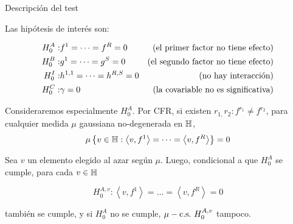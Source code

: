 \documentclass[10pt,spanish]{beamer}\usepackage[]{graphicx}\usepackage[]{color}
\begin{document}
%
\begin{frame}{Descripción del test}

Las hipótesis de interés son:

\vspace{-15pt}

\begin{alignat*}{2}
H_{0}^{A}: & f^{1}=\dots=f^{R}=0 & \textnormal{(el primer factor no tiene efecto)}\\
H_{0}^{B}: & g^{1}=\dots=g^{S}=0 & \textnormal{(el segundo factor no tiene efecto)}\\
H_{0}^{I}: & h^{1,1}=\dots=h^{R,S}=0 & \textnormal{(no hay interacción)}\\
H_{0}^{C}: & \gamma=0 & \textnormal{(la covariable no es significativa)}
\end{alignat*}


\pause{}

Consideraremos especialmente $H_{0}^{A}.$ Por CFR, si existen $r_{1,}r_{2}:f^{r_{1}}\neq f^{r_{2}}$,
para cualquier medida $\mu$ gaussiana no-degenerada en $\mathbb{H}$,
\[
\mu\left\{ v\in\mathbb{H}:\left\langle v,f^{1}\right\rangle =\dots=\left\langle v,f^{R}\right\rangle \right\} =0
\]


\pause{}

Sea $v$ un elemento elegido al azar según $\mu$. Luego, condicional
a que $H_{0}^{A}$ se cumple, para cada $v\in\mathbb{H}$

\vspace{-15pt}

\[
H_{0}^{A,v}:\left\langle v,f^{1}\right\rangle =\dots=\left\langle v,f^{R}\right\rangle =0
\]

también se cumple, y si $H_{0}^{A}$ no se cumple, $\mu-\textnormal{c.s.}\ H_{0}^{A,v}$
tampoco.
\end{frame}
\end{document}
